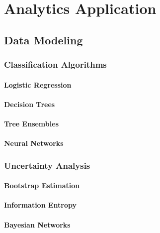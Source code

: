 \chapter{Analytics Application}\label{ch5:expl_applied}

\section{Data Modeling}

\subsection{Classification Algorithms}

\subsubsection{Logistic Regression}

\subsubsection{Decision Trees}\label{ch5:decision_trees}

\subsubsection{Tree Ensembles}

\subsubsection{Neural Networks}

\subsection{Uncertainty Analysis}

\subsubsection{Bootstrap Estimation}

\subsubsection{Information Entropy}

\subsubsection{Bayesian Networks}
